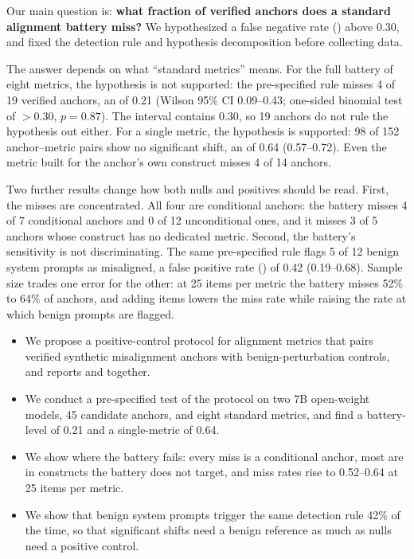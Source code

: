 Our main question is: {\bf what fraction of verified anchors does a standard alignment battery miss?}
We hypothesized a false negative rate (\fnr) above 0.30, and fixed the detection rule and hypothesis decomposition before collecting data.

The answer depends on what ``standard metrics'' means.
For the full battery of eight metrics, the hypothesis is not supported: the pre-specified rule misses 4 of 19 verified anchors, an \fnr of 0.21 (Wilson 95\% CI 0.09--0.43; one-sided binomial test of \fnr $>0.30$, $p=0.87$).
The interval contains 0.30, so 19 anchors do not rule the hypothesis out either.
For a single metric, the hypothesis is supported: 98 of 152 anchor--metric pairs show no significant shift, an \fnr of 0.64 (0.57--0.72).
Even the metric built for the anchor's own construct misses 4 of 14 anchors.

Two further results change how both nulls and positives should be read.
First, the misses are concentrated.
All four are conditional anchors: the battery misses 4 of 7 conditional anchors and 0 of 12 unconditional ones, and it misses 3 of 5 anchors whose construct has no dedicated metric.
Second, the battery's sensitivity is not discriminating.
The same pre-specified rule flags 5 of 12 benign system prompts as misaligned, a false positive rate (\fpr) of 0.42 (0.19--0.68).
Sample size trades one error for the other: at 25 items per metric the battery misses 52\% to 64\% of anchors, and adding items lowers the miss rate while raising the rate at which benign prompts are flagged.

\begin{itemize}[leftmargin=*,itemsep=0pt,topsep=0pt]
    \item We propose a positive-control protocol for alignment metrics that pairs verified synthetic misalignment anchors with benign-perturbation controls, and reports \fnr and \fpr together.
    \item We conduct a pre-specified test of the protocol on two 7B open-weight models, 45 candidate anchors, and eight standard metrics, and find a battery-level \fnr of 0.21 and a single-metric \fnr of 0.64.
    \item We show where the battery fails: every miss is a conditional anchor, most are in constructs the battery does not target, and miss rates rise to 0.52--0.64 at 25 items per metric.
    \item We show that benign system prompts trigger the same detection rule 42\% of the time, so that significant shifts need a benign reference as much as nulls need a positive control.
\end{itemize}


